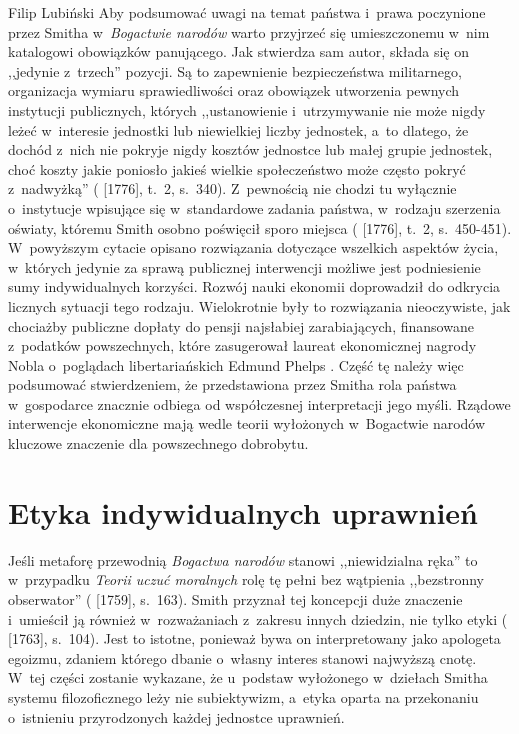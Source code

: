 \begin{artplenv}{Filip Lubiński}
Aby podsumować uwagi na temat państwa i~prawa poczynione przez Smitha w~\textit{Bogactwie narodów }warto przyjrzeć
się umieszczonemu w~nim katalogowi obowiązków panującego. Jak stwierdza sam autor, składa się on ,,jedynie z~trzech''
pozycji. Są to zapewnienie bezpieczeństwa militarnego, organizacja wymiaru sprawiedliwości oraz obowiązek utworzenia
pewnych instytucji publicznych, których ,,ustanowienie i~utrzymywanie nie może nigdy leżeć w~interesie jednostki lub
niewielkiej liczby jednostek, a~to dlatego, że dochód z~nich nie pokryje nigdy kosztów jednostce lub małej grupie
jednostek, choć koszty jakie poniosło jakieś wielkie społeczeństwo może często pokryć z~nadwyżką''
(\cite{smith_badania_2007} [1776], t.~2, s.~340).
Z~pewnością nie chodzi tu wyłącznie o~instytucje wpisujące
się w~standardowe zadania państwa, w~rodzaju szerzenia oświaty, któremu Smith osobno poświęcił sporo miejsca
(\cite{smith_badania_2007} [1776], t.~2, s.~450-451).
W~powyższym cytacie opisano rozwiązania dotyczące
wszelkich aspektów życia, w~których jedynie za sprawą publicznej interwencji możliwe jest podniesienie sumy
indywidualnych korzyści. Rozwój nauki ekonomii doprowadził do odkrycia licznych sytuacji tego rodzaju. Wielokrotnie
były to rozwiązania nieoczywiste, jak chociażby publiczne dopłaty do pensji najsłabiej zarabiających,
finansowane z~podatków powszechnych, które zasugerował laureat ekonomicznej nagrody Nobla o~poglądach libertariańskich Edmund Phelps
\parencite{phelps_placa_2013}.
Część tę należy więc podsumować stwierdzeniem, że przedstawiona przez Smitha
rola państwa w~gospodarce znacznie odbiega od współczesnej interpretacji jego myśli. Rządowe interwencje ekonomiczne
mają wedle teorii wyłożonych w~Bogactwie narodów kluczowe znaczenie dla powszechnego dobrobytu. 

\section{Etyka indywidualnych uprawnień}
Jeśli metaforę przewodnią \textit{Bogactwa narodów} stanowi ,,niewidzialna ręka'' to w~przypadku \textit{Teorii uczuć
moralnych} rolę tę pełni bez wątpienia ,,bezstronny obserwator''
(\cite{smith_teoria_1989} [1759], s.~163).
Smith przyznał tej koncepcji duże znaczenie i~umieścił ją również w~rozważaniach z~zakresu innych dziedzin, nie tylko
etyki
(\cite{smith_lectures_1982} [1763], s.~104).
Jest to istotne, ponieważ bywa on interpretowany jako
apologeta egoizmu, zdaniem którego dbanie o~własny interes stanowi najwyższą cnotę. W~tej części zostanie wykazane,
że u~podstaw wyłożonego w~dziełach Smitha systemu filozoficznego leży nie subiektywizm, a~etyka oparta na
przekonaniu o~istnieniu przyrodzonych każdej jednostce uprawnień.


\end{artplenv}
